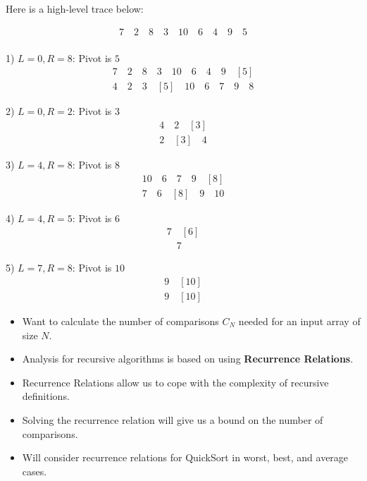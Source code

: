 \documentclass[a4paper,12pt]{article}
\begin{document}
\begin{center}
    Here is a high-level trace below:
\end{center}

\[
\begin{array}{c}
7 \quad 2 \quad 8 \quad 3 \quad 10 \quad 6 \quad 4 \quad 9 \quad 5 \\
\end{array}
\]

1) \(L = 0, R = 8\): Pivot is \(5\) \\
\[
\begin{array}{c}
7 \quad 2 \quad 8 \quad 3 \quad 10 \quad 6 \quad 4 \quad 9 \quad [5] \\
4 \quad 2 \quad 3 \quad [5] \quad 10 \quad 6 \quad 7 \quad 9 \quad 8
\end{array}
\]

2) \(L = 0, R = 2\): Pivot is \(3\) \\
\[
\begin{array}{c}
4 \quad 2 \quad [3] \\
2 \quad [3] \quad 4
\end{array}
\]

3) \(L = 4, R = 8\): Pivot is \(8\) \\
\[
\begin{array}{c}
10 \quad 6 \quad 7 \quad 9 \quad [8] \\
7 \quad 6 \quad [8] \quad 9 \quad 10
\end{array}
\]

4) \(L = 4, R = 5\): Pivot is \(6\) \\
\[
\begin{array}{c}
7 \quad [6] \\
[6] \quad 7
\end{array}
\]

5) \(L = 7, R = 8\): Pivot is \(10\) \\
\[
\begin{array}{c}
9 \quad [10] \\
9 \quad [10]
\end{array}
\]

\begin{itemize}
    \item Want to calculate the number of comparisons \(C_N\) needed for an input array of size \(N\).
    \item Analysis for recursive algorithms is based on using \textbf{Recurrence Relations}.
    \item Recurrence Relations allow us to cope with the complexity of recursive definitions.
    \item Solving the recurrence relation will give us a bound on the number of comparisons.
    \item Will consider recurrence relations for QuickSort in worst, best, and average cases.
\end{itemize}
\end{document}
